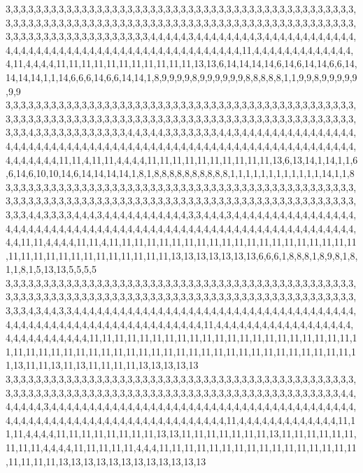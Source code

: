 3,3,3,3,3,3,3,3,3,3,3,3,3,3,3,3,3,3,3,3,3,3,3,3,3,3,3,3,3,3,3,3,3,3,3,3,3,3,3,3,3,3,3,3,3,3,3,3,3,3,3,3,3,3,3,3,3,3,3,3,3,3,3,3,3,3,3,3,3,3,3,3,3,3,3,3,3,3,3,3,3,3,3,3,3,3,3,3,3,3,3,3,3,3,3,3,3,3,3,3,3,3,3,3,3,3,3,3,3,3,3,4,4,4,4,4,3,4,4,4,4,4,4,4,4,3,4,4,4,4,4,4,4,4,4,4,4,4,4,4,4,4,4,4,4,4,4,4,4,4,4,4,4,4,4,4,4,4,4,4,4,4,4,4,4,4,4,4,4,11,4,4,4,4,4,4,4,4,4,4,4,4,4,4,11,4,4,4,4,11,11,11,11,11,11,11,11,11,11,11,13,13,6,14,14,14,14,6,14,6,14,14,6,6,14,14,14,14,1,1,14,6,6,6,14,6,6,14,14,1,8,9,9,9,9,8,9,9,9,9,9,9,8,8,8,8,8,1,1,9,9,8,9,9,9,9,9,9,9
3,3,3,3,3,3,3,3,3,3,3,3,3,3,3,3,3,3,3,3,3,3,3,3,3,3,3,3,3,3,3,3,3,3,3,3,3,3,3,3,3,3,3,3,3,3,3,3,3,3,3,3,3,3,3,3,3,3,3,3,3,3,3,3,3,3,3,3,3,3,3,3,3,3,3,3,3,3,3,3,3,3,3,3,3,3,3,3,3,3,3,3,3,3,3,4,3,3,3,3,3,3,3,3,3,3,3,3,4,4,3,4,4,3,3,3,3,3,3,3,4,4,3,4,4,4,4,4,4,4,4,4,4,4,4,4,4,4,4,4,4,4,4,4,4,4,4,4,4,4,4,4,4,4,4,4,4,4,4,4,4,4,4,4,4,4,4,4,4,4,4,4,4,4,4,4,4,4,4,4,4,4,4,4,4,4,4,4,4,4,4,11,11,4,11,11,4,4,4,4,11,11,11,11,11,11,11,11,11,11,13,6,13,14,1,14,1,1,6,6,14,6,10,10,14,6,14,14,14,14,1,8,1,8,8,8,8,8,8,8,8,8,8,1,1,1,1,1,1,1,1,1,1,1,1,14,1,1,8
3,3,3,3,3,3,3,3,3,3,3,3,3,3,3,3,3,3,3,3,3,3,3,3,3,3,3,3,3,3,3,3,3,3,3,3,3,3,3,3,3,3,3,3,3,3,3,3,3,3,3,3,3,3,3,3,3,3,3,3,3,3,3,3,3,3,3,3,3,3,3,3,3,3,3,3,3,3,3,3,3,3,3,3,3,3,3,3,3,3,3,3,3,3,3,4,4,3,3,3,3,4,4,4,3,4,4,4,4,4,4,4,4,4,4,4,3,3,4,4,4,3,4,4,4,4,4,4,4,4,4,4,4,4,4,4,4,4,4,4,4,4,4,4,4,4,4,4,4,4,4,4,4,4,4,4,4,4,4,4,4,4,4,4,4,4,4,4,4,4,4,4,4,4,4,4,4,4,4,4,4,4,4,4,4,4,11,11,4,4,4,4,11,11,4,11,11,11,11,11,11,11,11,11,11,11,11,11,11,11,11,11,11,11,11,11,11,11,11,11,11,11,11,11,11,11,11,11,13,13,13,13,13,13,13,6,6,6,1,8,8,8,1,8,9,8,1,8,1,1,8,1,5,13,13,5,5,5,5
3,3,3,3,3,3,3,3,3,3,3,3,3,3,3,3,3,3,3,3,3,3,3,3,3,3,3,3,3,3,3,3,3,3,3,3,3,3,3,3,3,3,3,3,3,3,3,3,3,3,3,3,3,3,3,3,3,3,3,3,3,3,3,3,3,3,3,3,3,3,3,3,3,3,3,3,3,3,3,3,3,3,3,3,3,3,3,3,3,3,3,3,3,3,3,4,3,4,4,3,3,4,4,4,4,4,4,4,4,4,4,4,4,4,4,4,4,4,4,4,4,4,4,4,4,4,4,4,4,4,4,4,4,4,4,4,4,4,4,4,4,4,4,4,4,4,4,4,4,4,4,4,4,4,4,4,4,4,4,4,4,4,4,4,11,4,4,4,4,4,4,4,4,4,4,4,4,4,4,4,4,4,4,4,4,4,4,4,4,4,4,4,4,4,11,11,11,11,11,11,11,11,11,11,11,11,11,11,11,11,11,11,11,11,11,11,11,11,11,11,11,11,11,11,11,11,11,11,11,11,11,11,11,11,11,11,11,11,11,11,11,11,11,11,13,11,11,13,11,13,11,11,11,11,13,13,13,13,13
3,3,3,3,3,3,3,3,3,3,3,3,3,3,3,3,3,3,3,3,3,3,3,3,3,3,3,3,3,3,3,3,3,3,3,3,3,3,3,3,3,3,3,3,3,3,3,3,3,3,3,3,3,3,3,3,3,3,3,3,3,3,3,3,3,3,3,3,3,3,3,3,3,3,3,3,3,3,3,3,3,3,3,3,3,3,3,3,3,3,4,4,4,4,4,4,4,3,4,4,4,4,4,4,4,4,4,4,4,4,4,4,4,4,4,4,4,4,4,4,4,4,4,4,4,4,4,4,4,4,4,4,4,4,4,4,4,4,4,4,4,4,4,4,4,4,4,4,4,4,4,4,4,4,4,4,4,4,4,4,4,4,4,4,4,4,4,11,4,4,4,4,4,4,4,4,4,4,4,4,4,11,11,11,4,4,4,4,11,11,11,11,11,11,11,11,13,13,11,11,11,11,11,11,11,13,11,11,11,11,11,11,11,11,11,4,4,4,4,11,11,11,11,11,4,4,4,11,11,11,11,11,11,11,11,11,11,11,11,11,11,11,11,11,11,11,11,13,13,13,13,13,13,13,13,13,13,13,13
